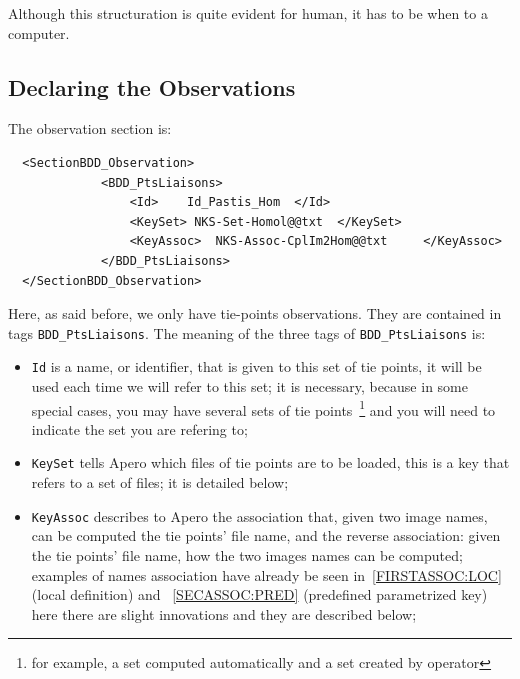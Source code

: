 Although this structuration is quite evident for human, it has
to be  when  to a computer.

\subsection{Declaring the Observations}

The  observation section is:

{\scriptsize
\begin{verbatim}
  <SectionBDD_Observation>
             <BDD_PtsLiaisons>
                 <Id>    Id_Pastis_Hom  </Id>
                 <KeySet> NKS-Set-Homol@@txt  </KeySet>
                 <KeyAssoc>  NKS-Assoc-CplIm2Hom@@txt     </KeyAssoc>
             </BDD_PtsLiaisons>
  </SectionBDD_Observation>

\end{verbatim}
}

Here, as said before, we only have tie-points observations.
They are contained in tags  {\tt BDD\_PtsLiaisons}.
The meaning of the three tags of  {\tt BDD\_PtsLiaisons} is:

\begin{itemize}
    \item {\tt Id} is a name, or identifier, that is given to this set
          of tie points, it will be used each time we will refer to this set;
          it is necessary, because in some special cases, you may have several
          sets of tie points~\footnote{for example, a set computed automatically 
          and a set created by operator} and you will need to indicate the set 
          you are refering to;

    \item  {\tt KeySet} tells Apero  which files of tie points are to be
           loaded, this is a key that refers to a set of files;
           it is detailed below;

    \item  {\tt KeyAssoc} describes to Apero the association that, given
           two image names, can be computed the tie points' file name, and the reverse
           association: given the tie points' file name, how the two images names can be computed;
           examples of names association have already be seen in~\ref{FIRSTASSOC:LOC} (local definition)
            and ~\ref{SECASSOC:PRED} (predefined parametrized key)
           here there are slight innovations and they are described below;
\end{itemize}

